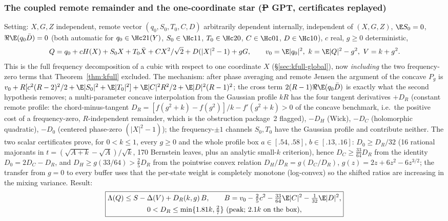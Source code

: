 \subsubsection{The coupled remote remainder and the one-coordinate star (\st{P} GPT, certificates replayed)}\label{sec:knext-star}
Setting: $X,G,Z$ independent, remote vector $(q_0,S_0,T_0,C,D)$ arbitrarily dependent internally, independent of $(X,G,Z)$, $\E S_0=0$, $\Re\E(q_0\bar D)=0$ (both automatic for
$q_0\in\Hc21(Y)$, $S_0\in\Hc11$, $T_0\in\Hc20$, $C\in\Hc01$, $D\in\Hc10$), $c$ real, $g\ge0$ deterministic,
\[
Q=q_0+cH(X)+S_0X+T_0\bar X+CX^2/\sqrt2+D(|X|^2-1)+gG,\qquad v_0=\E|q_0|^2,\ k=\E|Q|^2-g^2,\ V=k+g^2 .
\]
This is the full frequency decomposition of a cubic with respect to one coordinate $X$ (\S\ref{sec:kfull-global}), now \emph{including} the two frequency-zero terms that
Theorem~\ref{thm:kfull} excluded. The mechanism: after phase averaging and remote Jensen the argument of the concave $P_g$ is $v_0+R[c^2(R-2)^2/2+\E|S_0|^2+\E|T_0|^2]+\E|C|^2R^2/2+\E|D|^2(R-1)^2$;
the cross term $2(R-1)\Re\E(q_0\bar D)$ is exactly what the second hypothesis removes; a multi-parameter concave interpolation from the Gaussian profile $kR$ has the four tangent
derivatives $+D_R$ (constant remote profile: the chord-minus-tangent $D_R=[f(g^2+k)-f(g^2)]/k-f'(g^2+k)>0$ of the concave benchmark, i.e.\ the positive cost of a frequency-zero,
$R$-independent remainder, which is the obstruction package~2 flagged), $-D_H$ (Wick), $-D_C$ (holomorphic quadratic), $-D_0$ (centered phase-zero $(|X|^2-1)$); the frequency-$\pm1$ channels
$S_0,T_0$ have the Gaussian profile and contribute neither. The two scalar certificates prove, for $0<k\le1$, every $g\ge0$ and the whole profile box $a\in[.54,.58]$, $b\in[.13,.16]$:
$D_0\ge D_R/32$ (16 rational majorants in $t=(\sqrt{A+k}-\sqrt A)/\sqrt k$, 170 Bernstein leaves, plus an analytic small-$k$ criterion), hence $D_C\ge\frac{33}{64}D_R$ from the identity
$D_0=2D_C-D_R$, and $D_H\ge g(33/64)>\frac25D_R$ from the pointwise convex relation $D_H/D_R=g(D_C/D_R)$, $g(z)=2z+6z^2-6z^{3/2}$; the transfer from $g=0$ to every buffer uses that the
per-state weight is completely monotone (log-convex) so the shifted ratios are increasing in the mixing variance. Result:
\[
\boxed{\begin{gathered}\Lambda(Q)\le S-\Delta(V)+D_R(k,g)\,B,\qquad B=v_0-\tfrac25c^2-\tfrac{33}{64}\E|C|^2-\tfrac1{32}\E|D|^2,\\
0<D_R\le\min\{1.81k,\tfrac27\}\ \text{(peak; $2.1k$ on the box)},\end{gathered}}
\]
